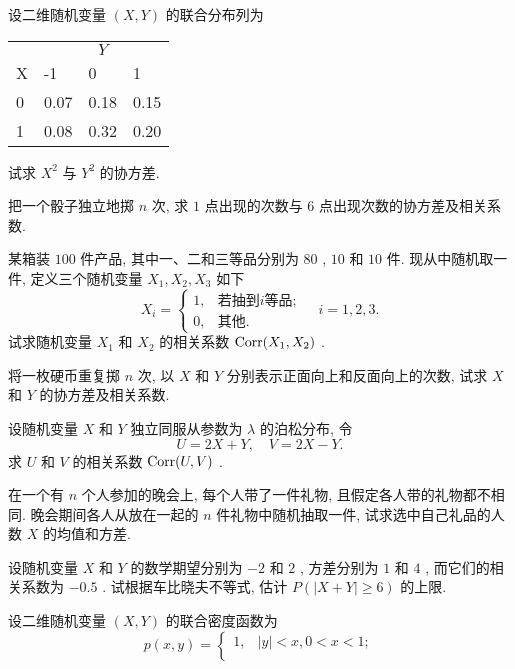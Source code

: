 \begin{xiti}
		\item 设二维随机变量 $(X,Y)$ 的联合分布列为
			\begin{center}
				\begin{tabularx}{0.8\textwidth}{YYYY}
					\toprule
					 & \\
					X & -1 & 0 & 1\\
					 & 0.07 & 0.18 & 0.15\\
					1 & 0.08 & 0.32 & 0.20\\
					\bottomrule
				\end{tabularx}
			\end{center}
			试求 $X^2$ 与 $Y^2$ 的协方差.
			\item 把一个骰子独立地掷 $n$ 次, 求 $1$ 点出现的次数与 $6$ 点出现次数的协方差及相关系数.
			\item 某箱装 $100$ 件产品, 其中一、二和三等品分别为 $80$ , $10$ 和 $10$ 件. 现从中随机取一件, 定义三个随机变量 $X_1,X_2,X_3$ 如下
				\begin{equation*}
					X_i=\begin{cases}
						1, & \text{若抽到} i \text{等品};\\
						0, & \text{其他}.
					\end{cases}\quad
					i=1,2,3.
				\end{equation*}
				试求随机变量 $X_1$ 和 $X_2$ 的相关系数 $\operatorname{Corr}(X_1,X_2)$ .
			\item 将一枚硬币重复掷 $n$ 次, 以 $X$ 和 $Y$ 分别表示正面向上和反面向上的次数, 试求 $X$ 和 $Y$ 的协方差及相关系数.
			\item 设随机变量 $X$ 和 $Y$ 独立同服从参数为 $\lambda$ 的泊松分布, 令
				\begin{equation*}
					U=2X+Y,\quad V=2X-Y.
				\end{equation*}
				求 $U$ 和 $V$ 的相关系数 $\operatorname{Corr}(U,V)$ .
			\item 在一个有 $n$ 个人参加的晚会上, 每个人带了一件礼物, 且假定各人带的礼物都不相同. 晚会期间各人从放在一起的 $n$ 件礼物中随机抽取一件, 试求选中自己礼品的人数 $X$ 的均值和方差.
			\item 设随机变量 $X$ 和 $Y$ 的数学期望分别为 $-2$ 和 $2$ , 方差分别为 $1$ 和 $4$ , 而它们的相关系数为 $-0.5$ . 试根据车比晓夫不等式, 估计 $P(|X+Y|\geqslant 6)$ 的上限.
			\item 设二维随机变量 $(X,Y)$ 的联合密度函数为
				\begin{equation*}
					p(x,y)=\begin{cases}
						1, & |y|<x,0<x<1;\\

\end{cases}
\end{equation*}
\end{xiti}
